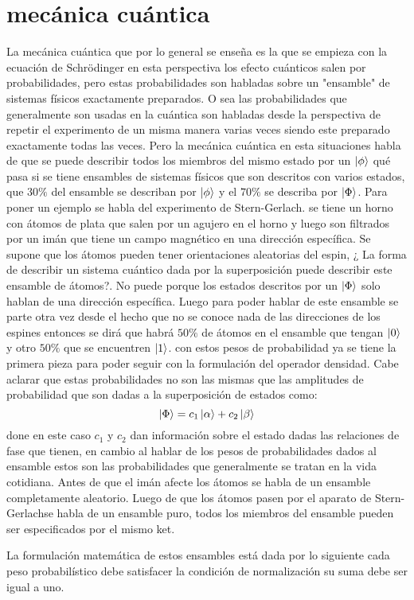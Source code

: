 \section{mecánica cuántica}
La mecánica cuántica que por lo general se enseña es la que se empieza con la ecuación de Schrödinger en esta perspectiva los efecto cuánticos salen por probabilidades, pero estas probabilidades son habladas sobre un "ensamble" de sistemas físicos exactamente preparados. O sea las probabilidades que generalmente son usadas en la cuántica son habladas desde la perspectiva de repetir el experimento de un misma manera varias veces siendo este preparado exactamente todas las veces. Pero la mecánica cuántica en esta situaciones habla de que se puede describir todos los miembros del mismo estado por un $\ket{\phi}$ qué pasa si se tiene ensambles de sistemas físicos que son descritos con varios estados, que $30 \% $ del ensamble se describan por $\ket{\phi}$ y el $70 \% $ se describa por $\ket{\Phi}$. 
Para poner un ejemplo se habla del experimento de Stern-Gerlach. se tiene un horno con átomos de plata que salen por un agujero en el horno y luego son filtrados por un imán que tiene un campo magnético en una dirección específica. Se supone que los átomos pueden tener orientaciones aleatorias del espin, ¿ La forma de describir un sistema cuántico dada por la superposición puede describir este ensamble de átomos?. No puede porque los estados descritos por un $\ket{\Phi}$ solo hablan de una dirección específica. Luego para poder hablar de este ensamble se parte otra vez desde el hecho que no se conoce nada de las direcciones de los espines entonces se dirá que habrá $50 \% $ de átomos en el ensamble que tengan $\ket{0}$ y otro $50 \% $ que se encuentren $\ket{1}$. con estos pesos de probabilidad ya se tiene la primera pieza para poder seguir con la formulación del operador densidad. Cabe aclarar que estas probabilidades no son las mismas que las amplitudes de probabilidad que son dadas a la superposición de estados como:
\begin{equation}
\ket{\Phi}=c_{1}\ket{\alpha}+ c_{2}\ket{\beta}
\end{equation}
done en este caso $c_{1}$ y $c_{2}$ dan información sobre el estado dadas las relaciones de fase que tienen, en cambio al hablar de los pesos de probabilidades dados al ensamble estos son las probabilidades que generalmente se tratan en la vida cotidiana. Antes de que el imán afecte los átomos se habla de un ensamble completamente aleatorio. Luego de que los átomos pasen por el aparato de Stern-Gerlachse habla de un ensamble puro, todos los miembros del ensamble pueden ser especificados por el mismo ket.

La formulación matemática de estos ensambles está dada por lo siguiente cada peso probabilístico debe satisfacer la condición de normalización su suma debe ser igual a uno.


